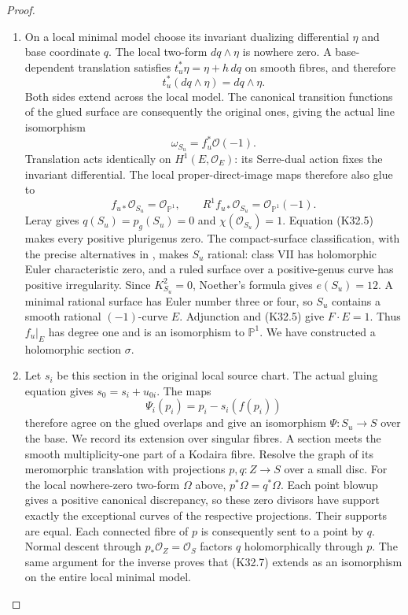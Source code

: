 \begin{proof}
\begin{enumerate}[label=\arabic*.]
\item On a local minimal model choose its invariant dualizing
differential $\eta$ and base coordinate $q$. The local
two-form $dq\wedge\eta$ is nowhere zero. A base-dependent
translation satisfies $t_u^*\eta=\eta+h\,dq$ on smooth
fibres, and therefore
\[
             t_u^*(dq\wedge\eta)=dq\wedge\eta.
\]
Both sides extend across the local model. The canonical
transition functions of the glued surface are consequently
the original ones, giving the actual line isomorphism
\[
                    \omega_{S_u}=f_u^*\mathcal O(-1).
                                                               \tag{K32.5}
\]
Translation acts identically on $H^1(E,\mathcal O_E)$:
its Serre-dual action fixes the invariant differential.
The local proper-direct-image maps therefore also glue to
\[
 f_{u*}\mathcal O_{S_u}=\mathcal O_{\mathbb P^1},\qquad
 R^1f_{u*}\mathcal O_{S_u}=\mathcal O_{\mathbb P^1}(-1).
                                                               \tag{K32.6}
\]
Leray gives $q(S_u)=p_g(S_u)=0$ and $\chi(\mathcal O_{S_u})=1$.
Equation (K32.5) makes every positive plurigenus zero.
The compact-surface classification, with the precise alternatives
in \cite[VI.1.1 and Table~10, pp.~243--244]{P4_BHPV2004},
makes $S_u$ rational: class VII has holomorphic Euler
characteristic zero, and a ruled surface over a positive-genus
curve has positive irregularity. Since $K_{S_u}^2=0$,
Noether's formula gives $e(S_u)=12$. A minimal rational
surface has Euler number three or four, so $S_u$ contains
a smooth rational $(-1)$-curve $E$. Adjunction and (K32.5)
give $F\cdot E=1$. Thus $f_u|_E$ has degree one and is
an isomorphism to $\mathbb P^1$. We have constructed a
holomorphic section $\sigma$.

\item Let $s_i$ be this section in the original local source chart.
The actual gluing equation gives
$s_0=s_i+u_{0i}$. The maps
\[
                 \Psi_i(p_i)=p_i-s_i(f(p_i))            \tag{K32.7}
\]
therefore agree on the glued overlaps and give an isomorphism
$\Psi:S_u\to S$ over the base.
We record its extension over singular fibres. A section
meets the smooth multiplicity-one part of a Kodaira fibre.
Resolve the graph of its meromorphic translation with
projections $p,q:Z\to S$ over a small disc. For the local
nowhere-zero two-form $\Omega$ above, $p^*\Omega=q^*\Omega$.
Each point blowup gives a positive canonical discrepancy,
so these zero divisors have support exactly the exceptional
curves of the respective projections. Their supports are
equal. Each connected fibre of $p$ is consequently sent to
a point by $q$. Normal descent through $p_*\mathcal O_Z
=\mathcal O_S$ factors $q$ holomorphically through $p$.
The same argument for the inverse proves that (K32.7)
extends as an isomorphism on the entire local minimal model.


\end{enumerate}
\end{proof}
